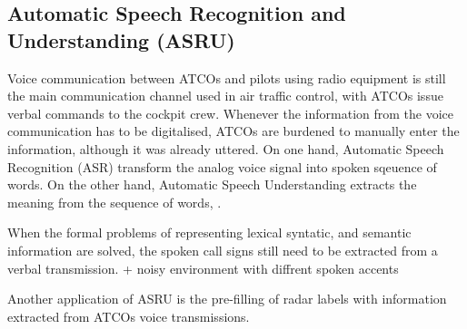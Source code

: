 \subsection{Automatic Speech Recognition and Understanding (ASRU)}

Voice communication between ATCOs and pilots using radio equipment is still the main communication channel used in air traffic control, with ATCOs issue verbal commands to the cockpit crew. 
Whenever the information from the voice communication has to be digitalised, ATCOs are burdened to manually enter the information, although it was already uttered. 
On one hand, Automatic Speech Recognition (ASR) transform the analog voice signal into spoken sqeuence of words.
On the other hand, Automatic Speech Understanding extracts the meaning from the sequence of words, .

When the formal problems of representing lexical syntatic, and semantic information are solved, the spoken call signs still need to be extracted from a verbal transmission. 
+ noisy environment with diffrent spoken accents

Another application of ASRU is the pre-filling of radar labels with information extracted from ATCOs voice transmissions. 


